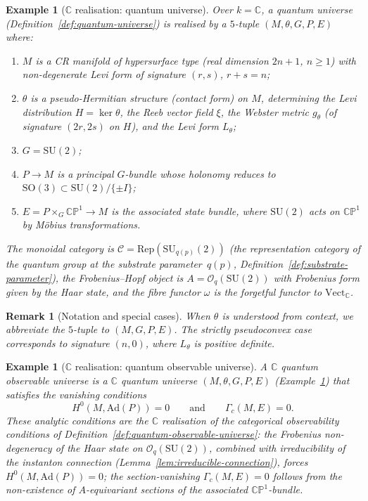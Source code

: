 \documentclass[12pt,a4paper]{report}
\newtheorem{example}[theorem]{Example}
\newtheorem{remark}[theorem]{Remark}
\begin{document}
\begin{example}[$\mathbb{C}$ realisation: quantum universe]
\label{def:c-quantum-universe}
Over $k = \mathbb{C}$, a quantum universe
(Definition~\ref{def:quantum-universe}) is realised by a $5$-tuple
$(M, \theta, G, P, E)$ where:
\begin{enumerate}
  \item $M$ is a CR manifold of hypersurface type
        (real dimension $2n+1$, $n \geq 1$) with non-degenerate Levi form
        of signature $(r,s)$, $r + s = n$;
  \item $\theta$ is a pseudo-Hermitian structure (contact form) on $M$,
        determining the Levi distribution $H = \ker\theta$, the Reeb vector
        field $\xi$, the Webster metric $g_\theta$ (of signature $(2r,2s)$
        on $H$), and the Levi form $L_\theta$;
  \item $G = \mathrm{SU}(2)$;
  \item $P \to M$ is a principal $G$-bundle whose holonomy reduces to
        $\mathrm{SO}(3) \subset \mathrm{SU}(2)/\{\pm I\}$;
  \item $E = P \times_G \mathbb{CP}^1 \to M$ is the associated
        \emph{state bundle}, where $\mathrm{SU}(2)$ acts on
        $\mathbb{CP}^1$ by M\"obius transformations.
\end{enumerate}
The monoidal category is $\mathcal{C} = \mathrm{Rep}(\mathrm{SU}_{q(p)}(2))$
(the representation category of the quantum group at the substrate
parameter~$q(p)$, Definition~\ref{def:substrate-parameter}), the
Frobenius--Hopf object is
$A = \mathcal{O}_q(\mathrm{SU}(2))$ with Frobenius form given by the
Haar state, and the fibre functor $\omega$ is the forgetful functor
to $\mathrm{Vect}_{\mathbb{C}}$.
\end{example}

\begin{remark}[Notation and special cases]
\label{rem:notation-special-cases}
When $\theta$ is understood from context, we abbreviate the $5$-tuple to
$(M, G, P, E)$.  The \emph{strictly pseudoconvex} case corresponds to
signature $(n,0)$, where $L_\theta$ is positive definite.
\end{remark}

\begin{example}[$\mathbb{C}$ realisation: quantum observable universe]
\label{def:c-quantum-observable-universe}
A \emph{$\mathbb{C}$ quantum observable universe} is a $\mathbb{C}$ quantum
universe $(M, \theta, G, P, E)$
(Example~\ref{def:c-quantum-universe}) that satisfies
the vanishing conditions
\[
  H^0(M, \mathrm{Ad}(P)) = 0
  \qquad\text{and}\qquad
  \Gamma_c(M, E) = 0.
\]
These analytic conditions are the $\mathbb{C}$ realisation of the
categorical observability conditions of
Definition~\ref{def:quantum-observable-universe}: the Frobenius
non-degeneracy of the Haar state on $\mathcal{O}_q(\mathrm{SU}(2))$,
combined with irreducibility of the instanton connection
(Lemma~\ref{lem:irreducible-connection}), forces
$H^0(M, \mathrm{Ad}(P)) = 0$; the section-vanishing
$\Gamma_c(M, E) = 0$ follows from the non-existence of
$A$-equivariant sections of the associated $\mathbb{CP}^1$-bundle.
\end{example}
\end{document}
